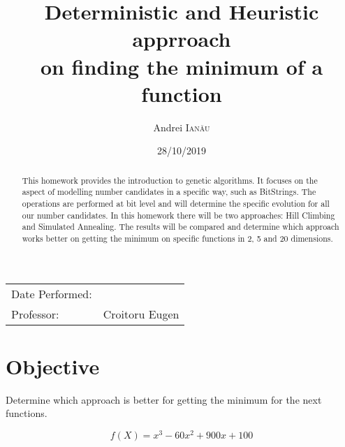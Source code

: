 \documentclass{article}
\title{Deterministic and Heuristic apprroach \\ on finding the minimum of a function} %
\author{Andrei \textsc{Ianău}} %
\begin{document}
\maketitle %

\begin{center}
\begin{tabular}{l r}
Date Performed: & \date{28/10/2019} \\ %
Professor: & Croitoru Eugen %
\end{tabular}
\end{center}



\begin{abstract}

This homework provides the introduction to genetic algorithms. It focuses on the aspect of modelling number candidates in a specific way, such as BitStrings. The operations are performed at bit level and will determine the specific evolution for all our number candidates. In this homework there will be two approaches: Hill Climbing and Simulated Annealing. The results will be compared and determine which approach works better on getting the minimum on specific functions in 2, 5 and 20 dimensions.

\end{abstract}


\section{Objective}

Determine which approach is better for getting the minimum for the next functions.

		\begin{equation}
		f(X)=x^3-60x^2+900x+100
		\end{equation}
 
\end{document}
